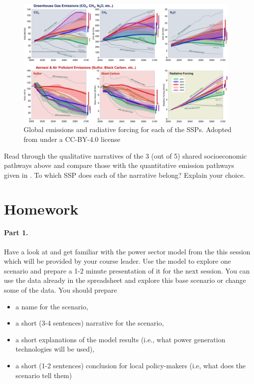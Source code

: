 \begin{figure}[hb]
	\includegraphics[width=0.98\textwidth]{files/SSP_pathways.jpg}
	\caption[Global emissions and radiative forcing for SSPs.]{Global emissions and radiative forcing for each of the SSPs. Adopted from \cite{riahi_shared_2017} under a CC-BY-4.0 license}
\end{figure}

\begin{kaobox}[frametitle=Task]
Read through the qualitative narratives of the 3 (out of 5) shared socioeconomic pathways above and compare those with the quantitative emission pathways given in . To which SSP does each of the narrative belong? Explain your choice.
\end{kaobox}






\section{Homework}

\paragraph*{Part 1.} Have a look at and get familiar with the power sector model from the this session which will be provided by your course leader. Use the model to explore one scenario and prepare a 1-2 minute presentation of it for the next session. You can use the data already in the spreadsheet and explore this base scenario or change some of the data. You should prepare
\begin{itemize}
\item a name for the scenario,
\item a short (3-4 sentences) narrative for the scenario,
\item a short explanations of the model results (i.e., what power generation technologies will be used),
\item a short (1-2 sentences) conclusion for local policy-makers (i.e, what does the scenario tell them)
\end{itemize}


